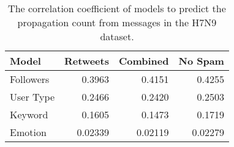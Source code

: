 \begin{table}
\centering
\begin{tabular}{l|r|r|r}
Model & Retweets & Combined & No Spam \\ \hline
Followers & 0.3963  & 0.4151 & 0.4255\\
User Type & 0.2466 & 0.2420 & 0.2503\\
Keyword & 0.1605 & 0.1473 & 0.1719 \\
Emotion & 0.02339 & 0.02119 & 0.02279 \\ \hline
\end{tabular}
\caption{The correlation coefficient of models to predict the propagation count from messages in the H7N9 dataset. }
\label{tab:modelcor3}
\end{table}

